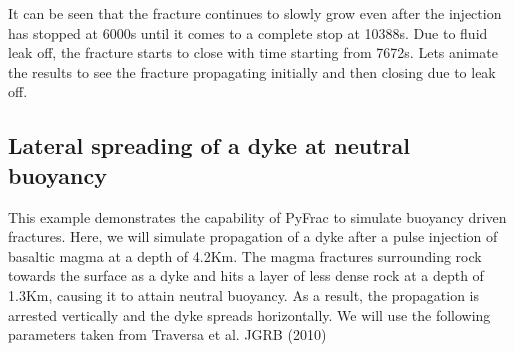 \documentclass[letterpaper,10pt,english]{sphinxmanual}
\begin{document}

\sphinxAtStartPar
It can be seen that the fracture continues to slowly grow even after the injection has stopped at 6000s until it comes to a complete stop at 10388s. Due to fluid leak off, the fracture starts to close with time starting from 7672s. Lets animate the results to see the fracture propagating initially and then closing due to leak off.

\begin{sphinxVerbatim}[commandchars=\\\{\}]
   

 \PYG{p}{[}\PYG{p}{]}
\end{sphinxVerbatim}


\subsection{Lateral spreading of a dyke at neutral buoyancy}
\label{\detokenize{Examples:lateral-spreading-of-a-dyke-at-neutral-buoyancy}}
\sphinxAtStartPar
This example demonstrates the capability of PyFrac to simulate buoyancy driven fractures. Here, we will simulate propagation of a dyke after a pulse injection of basaltic magma at a depth of 4.2Km. The magma fractures surrounding rock towards the surface as a dyke and  hits a layer of less dense rock  at a depth of 1.3Km, causing it to attain neutral buoyancy. As a result, the propagation is arrested vertically and the dyke spreads horizontally. We will use the following parameters taken from Traversa et al. \sphinxhyphen{} JGR\sphinxhyphen{}B (2010)
\end{document}
